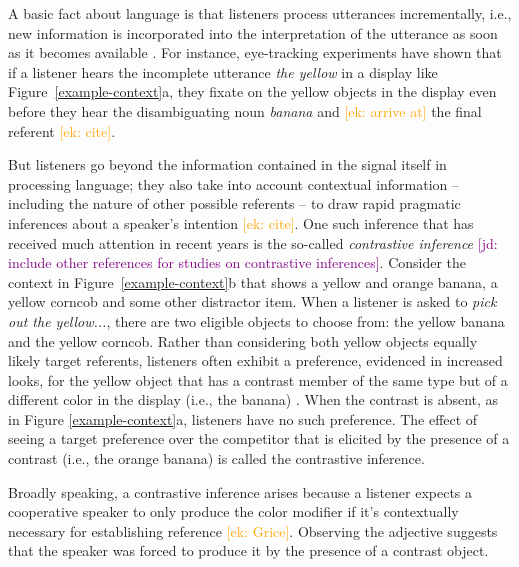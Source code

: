 \documentclass[10pt,letterpaper]{article}
\newcommand{\ek}[1]{\textcolor{Orange}{[ek: #1]}}
\newcommand{\jd}[1]{\textcolor{Purple}{[jd: #1]}}
\newcommand{\figref}[1]{Figure \ref{#1}}
\begin{document}
A basic fact about language is that listeners process utterances incrementally, i.e., new information is incorporated into the interpretation of the utterance as soon as it becomes available \cite{Eberhard:1995}. For instance, eye-tracking experiments have shown that if a listener hears the incomplete utterance \textit{the yellow} in a display like Figure~\ref{example-context}a, they fixate on the yellow objects in the display even before they hear the disambiguating noun \textit{banana} and \ek{arrive at} the final referent \ek{cite}.

But listeners go beyond the information contained in the signal itself in processing language; they also take into account contextual information -- including the nature of other possible referents  -- to draw rapid pragmatic inferences about a speaker's intention \ek{cite}. One such inference that has received much attention in recent years is the so-called \emph{contrastive inference} \cite{Sedivy:1999}\jd{include other references for studies on contrastive inferences}. Consider the context in Figure~\ref{example-context}b that shows a yellow and orange banana, a yellow corncob and some other distractor item. When a listener is asked to \textit{pick out the yellow...}, there are two eligible objects to choose from: the yellow banana and the yellow corncob. Rather than considering both yellow objects equally likely target referents, listeners often exhibit a preference, evidenced in increased looks, for the yellow object that has a contrast member of the same type but of a different color in the display (i.e., the banana) \cite{Sedivy:1999, Sedivy:2003}. When the contrast is absent, as in \figref{example-context}a, listeners have no such preference. The effect of seeing a target preference over the competitor that is elicited by the presence of a contrast (i.e., the orange banana) is called the contrastive inference. 

Broadly speaking, a contrastive inference arises because a listener expects a cooperative speaker to only produce the color modifier if it's contextually necessary for establishing reference \ek{Grice}. Observing the adjective suggests that the speaker was forced to produce it by the presence of a contrast object.
\end{document}
